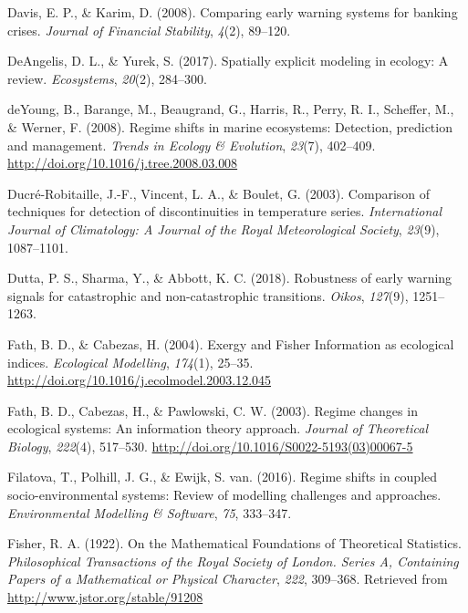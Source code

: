 \documentclass[12pt,twoside,openany]{reedthesis}
\begin{document}
\hypertarget{ref-davis_comparing_2008}{}
Davis, E. P., \& Karim, D. (2008). Comparing early warning systems for
banking crises. \emph{Journal of Financial Stability}, \emph{4}(2),
89--120.

\hypertarget{ref-deangelis2017spatially}{}
DeAngelis, D. L., \& Yurek, S. (2017). Spatially explicit modeling in
ecology: A review. \emph{Ecosystems}, \emph{20}(2), 284--300.

\hypertarget{ref-deyoung_regime_2008}{}
deYoung, B., Barange, M., Beaugrand, G., Harris, R., Perry, R. I.,
Scheffer, M., \& Werner, F. (2008). Regime shifts in marine ecosystems:
Detection, prediction and management. \emph{Trends in Ecology \&
Evolution}, \emph{23}(7), 402--409.
\url{http://doi.org/10.1016/j.tree.2008.03.008}

\hypertarget{ref-ducre2003comparison}{}
Ducré-Robitaille, J.-F., Vincent, L. A., \& Boulet, G. (2003).
Comparison of techniques for detection of discontinuities in temperature
series. \emph{International Journal of Climatology: A Journal of the
Royal Meteorological Society}, \emph{23}(9), 1087--1101.

\hypertarget{ref-dutta2018robustness}{}
Dutta, P. S., Sharma, Y., \& Abbott, K. C. (2018). Robustness of early
warning signals for catastrophic and non-catastrophic transitions.
\emph{Oikos}, \emph{127}(9), 1251--1263.

\hypertarget{ref-fath_exergy_2004}{}
Fath, B. D., \& Cabezas, H. (2004). Exergy and Fisher Information as
ecological indices. \emph{Ecological Modelling}, \emph{174}(1), 25--35.
\url{http://doi.org/10.1016/j.ecolmodel.2003.12.045}

\hypertarget{ref-fath_regime_2003}{}
Fath, B. D., Cabezas, H., \& Pawlowski, C. W. (2003). Regime changes in
ecological systems: An information theory approach. \emph{Journal of
Theoretical Biology}, \emph{222}(4), 517--530.
\url{http://doi.org/10.1016/S0022-5193(03)00067-5}

\hypertarget{ref-filatova2016regime}{}
Filatova, T., Polhill, J. G., \& Ewijk, S. van. (2016). Regime shifts in
coupled socio-environmental systems: Review of modelling challenges and
approaches. \emph{Environmental Modelling \& Software}, \emph{75},
333--347.

\hypertarget{ref-fisher_mathematical_1922}{}
Fisher, R. A. (1922). On the Mathematical Foundations of Theoretical
Statistics. \emph{Philosophical Transactions of the Royal Society of
London. Series A, Containing Papers of a Mathematical or Physical
Character}, \emph{222}, 309--368. Retrieved from
\url{http://www.jstor.org/stable/91208}
\end{document}

